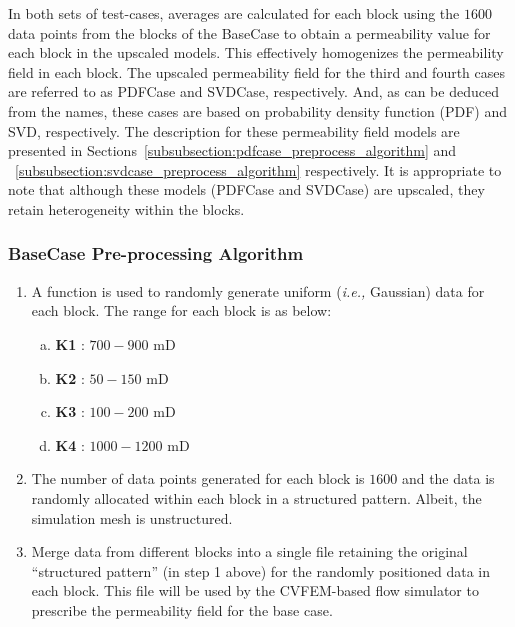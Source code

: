 \documentclass[preprint,12pt]{elsarticle}
\newcommand{\ie}{{\it i.e., }}
\begin{document}
In both sets of test-cases, averages are calculated for each block using the $1600$ data points from the blocks of the BaseCase to obtain a permeability value for each block in the upscaled models. This effectively homogenizes the permeability field in each block. The upscaled permeability field for the third and fourth cases are referred to as PDFCase and SVDCase, respectively. And, as can be deduced from the names, these cases are based on probability density function (PDF) and SVD, respectively. The description for these permeability field models are presented in Sections~\ref{subsubsection:pdfcase_preprocess_algorithm} and ~\ref{subsubsection:svdcase_preprocess_algorithm} respectively. It is appropriate to note that although these models (PDFCase and SVDCase) are upscaled, they retain heterogeneity within the blocks.

\subsubsection{BaseCase Pre-processing Algorithm}\label{subsubsection:basecase_preprocess_algorithm}
\begin{enumerate}[1.]
  \item A function is used to randomly generate uniform (\ie Gaussian) data for each block. The range for each block is as below:
  \begin{enumerate}[a)]
    \item \textbf{K1} : $700 - 900$ mD
    \item \textbf{K2} : $50 - 150$ mD
    \item \textbf{K3} : $100 - 200$ mD
    \item \textbf{K4} : $1000 - 1200$ mD
  \end{enumerate}                                                    
  \item The number of data points generated for each block is $1600$ and the data is randomly allocated within each block in a structured pattern. Albeit, the simulation mesh is unstructured.
  \item Merge data from different blocks into a single file retaining the original ``structured pattern'' (in step 1 above) for the randomly positioned data in each block. This file will be used by the CVFEM-based flow simulator to prescribe the permeability field for the base case.
\end{enumerate}
\end{document}

